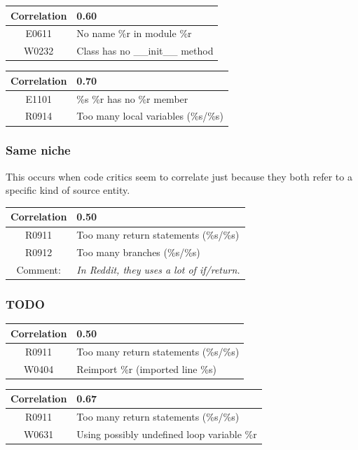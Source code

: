 \documentclass[12pt, a4paper]{article}
\newcommand{\tbf}[1]{\textbf{#1}}
\newcommand{\noi}{\noindent}
\begin{document}
\bigskip \noi
\begin{tabularx}{\textwidth}{|c|X|}
\hline
\tbf{Correlation}   & 0.60 \\
\hline
E0611   & No name \%r in module \%r \\
\hline
W0232   & Class has no \_\_init\_\_ method \\
\hline

\hline
\end{tabularx}

\bigskip \noi
\begin{tabularx}{\textwidth}{|c|X|}
\hline
\tbf{Correlation}   & 0.70 \\
\hline
E1101   & \%s \%r has no \%r member \\
\hline
R0914   & Too many local variables (\%s/\%s) \\
\hline
\end{tabularx}


\subsubsection*{Same niche}
This occurs when code critics seem to correlate just because they both refer to a specific kind of source entity.

\bigskip \noi
\begin{tabularx}{\textwidth}{|c|X|}
\hline
\tbf{Correlation}   & 0.50 \\
\hline
R0911   & Too many return statements (\%s/\%s) \\
\hline
R0912   & Too many branches (\%s/\%s) \\
\hline
Comment: & \textit{In Reddit, they uses a lot of if/return.}\\
\hline
\end{tabularx}

\subsubsection*{TODO}



\bigskip \noi
\begin{tabularx}{\textwidth}{|c|X|}
\hline
\tbf{Correlation}		& 0.50 \\
\hline
R0911		& Too many return statements (\%s/\%s) \\
\hline
W0404		& Reimport \%r (imported line \%s) \\
\hline
\end{tabularx}


\bigskip \noi
\begin{tabularx}{\textwidth}{|c|X|}
\hline
\tbf{Correlation}		& 0.67 \\
\hline
R0911		& Too many return statements (\%s/\%s) \\
\hline
W0631		& Using possibly undefined loop variable \%r \\
\hline
\end{tabularx}
\end{document}
